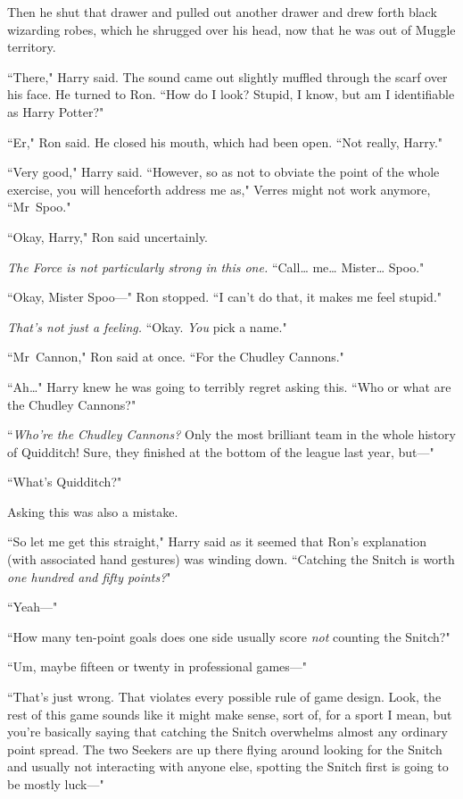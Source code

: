Then he shut that drawer and pulled out another drawer and drew forth black wizarding robes, which he shrugged over his head, now that he was out of Muggle territory.

``There," Harry said. The sound came out slightly muffled through the scarf over his face. He turned to Ron. ``How do I look? Stupid, I know, but am I identifiable as Harry Potter?"

``Er," Ron said. He closed his mouth, which had been open. ``Not really, Harry."

``Very good," Harry said. ``However, so as not to obviate the point of the whole exercise, you will henceforth address me as," Verres might not work anymore, ``Mr~Spoo."

``Okay, Harry," Ron said uncertainly.

\emph{The Force is not particularly strong in this one.} ``Call{\ldots} me{\ldots} Mister{\ldots} Spoo."

``Okay, Mister Spoo—" Ron stopped. ``I can't do that, it makes me feel stupid."

\emph{That's not just a feeling.} ``Okay. \emph{You} pick a name."

``Mr~Cannon," Ron said at once. ``For the Chudley Cannons."

``Ah{\ldots}" Harry knew he was going to terribly regret asking this. ``Who or what are the Chudley Cannons?"

``\emph{Who're the Chudley Cannons?} Only the most brilliant team in the whole history of Quidditch! Sure, they finished at the bottom of the league last year, but—"

``What's Quidditch?"

Asking this was also a mistake.

``So let me get this straight," Harry said as it seemed that Ron's explanation (with associated hand gestures) was winding down. ``Catching the Snitch is worth \emph{one hundred and fifty points?}"

``Yeah—"

``How many ten-point goals does one side usually score \emph{not} counting the Snitch?"

``Um, maybe fifteen or twenty in professional games—"

``That's just wrong. That violates every possible rule of game design. Look, the rest of this game sounds like it might make sense, sort of, for a sport I mean, but you're basically saying that catching the Snitch overwhelms almost any ordinary point spread. The two Seekers are up there flying around looking for the Snitch and usually not interacting with anyone else, spotting the Snitch first is going to be mostly luck—"

